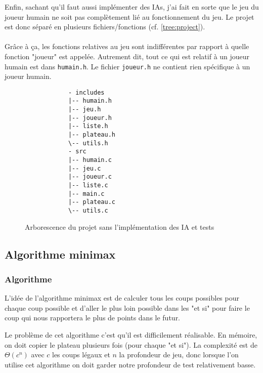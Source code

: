 \documentclass{article}
\begin{document}
Enfin, sachant qu'il faut aussi implémenter des IAs, j'ai fait en sorte que le jeu
du joueur humain ne soit pas complètement lié au fonctionnement du jeu. Le projet
est donc séparé en plusieurs fichiers/fonctions (cf. \autoref{tree:project}).
\\\\
Grâce à ça, les fonctions relatives au jeu sont indifférentes par rapport à quelle
fonction "joueur" est appelée. Autrement dit, tout ce qui est relatif à un joueur
humain est dans \texttt{humain.h}. Le fichier \texttt{joueur.h} ne contient rien
spécifique à un joueur humain.

\begin{figure}[ht]
    \centering
    \begin{minipage}{0.15\textwidth}
        \begin{verbatim}
            - includes
            |-- humain.h
            |-- jeu.h
            |-- joueur.h
            |-- liste.h
            |-- plateau.h
            \-- utils.h
            - src
            |-- humain.c
            |-- jeu.c
            |-- joueur.c
            |-- liste.c
            |-- main.c
            |-- plateau.c
            \-- utils.c
        \end{verbatim}
    \end{minipage}
    \caption{Arborescence du projet sans l'implémentation des IA et tests}
    \label{tree:project}
\end{figure}

\newpage
\subsection[Minimax]{Algorithme minimax}
\subsubsection{Algorithme}
L'idée de l'algorithme minimax est de calculer tous les coups possibles pour
chaque coup possible et d'aller le plus loin possible dans les "et si" pour faire
le coup qui nous rapportera le plus de points dans le futur.

Le problème de cet algorithme c'est qu'il est difficilement réalisable. En mémoire,
on doit copier le plateau plusieurs fois (pour chaque "et si"). La complexité est
de $\Theta(c^{n})$ avec $c$ les coups légaux et $n$ la profondeur de jeu, donc
lorsque l'on utilise cet algorithme on doit garder notre profondeur de test
relativement basse.
\end{document}
